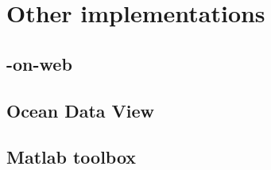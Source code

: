 \chapter{Other implementations\label{chap:general}}

\lettrine[lines=2, loversize=-0.1, lraise=0.1]{}{} 

\minitoc

\newpage %

\section{\diva-on-web}



\section{Ocean Data View}



\section{\diva Matlab toolbox}
